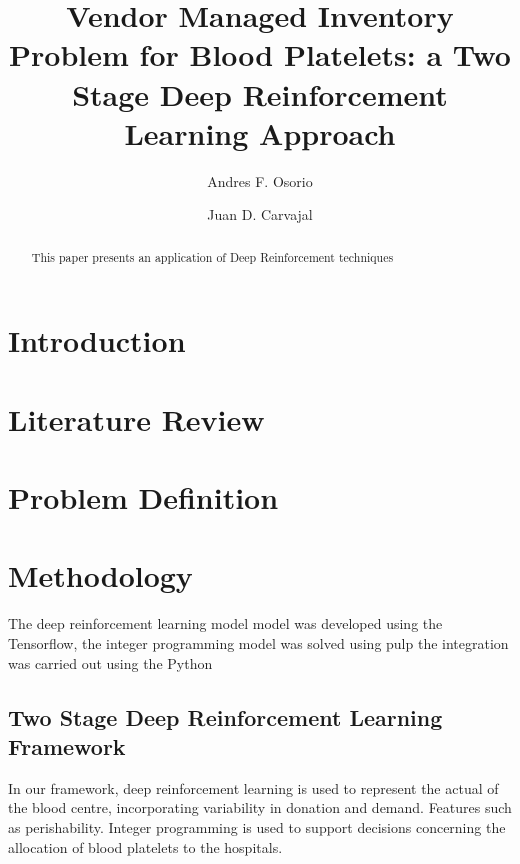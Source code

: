 \documentclass{elsarticle}
\begin{document}
\begin{frontmatter}

\title{Vendor Managed Inventory Problem for Blood Platelets: a Two Stage Deep Reinforcement Learning Approach}

\author[1]{Andres F. Osorio}
\author[2]{Juan D. Carvajal}


\address[1]{afosorio@icesi.edu.co}
\address[2]{juan030698@hotmail.com}


\begin{abstract}
	This paper presents an application of Deep Reinforcement techniques 
\end{abstract}


\end{frontmatter}


\section{Introduction}

\section{Literature Review}

\section{Problem Definition}

\section{Methodology}

		The deep reinforcement learning model model was developed using the Tensorflow, the integer programming model was solved using pulp the integration was carried out using the Python
		
		\cite{Feynman1963118}
		\cite{Dirac1953888}
		
	\subsection{Two Stage Deep Reinforcement Learning Framework}
	
	In our framework, deep reinforcement learning is used to represent the actual of the blood centre, incorporating variability in donation and demand. Features such as perishability. Integer programming is used to support decisions concerning the allocation of blood platelets to the hospitals.
\end{document}
